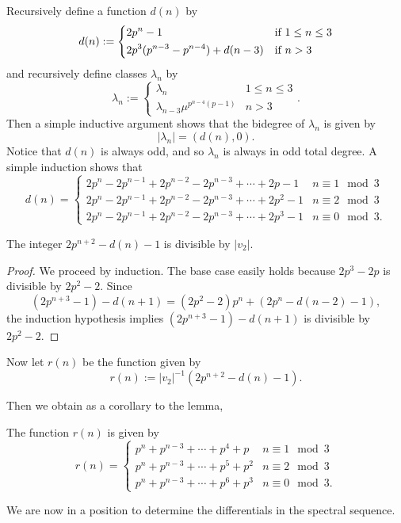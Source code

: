 Recursively define a function $d(n)$ by 
\[
d(n):= 
\begin{dcases*}
	2p^n-1 & if $1\leq n \leq 3$\\
	2p^3(p^{n-3}-p^{n-4}) + d(n-3) & if  $n>3$ 
\end{dcases*}
\]
and recursively define classes $\lambda_n$ by 
\[
\lambda_n:= \begin{cases}
	\lambda_n & 1\leq n \leq 3\\
	\lambda_{n-3}\mu^{p^{n-4}(p-1)} & n>3
\end{cases}.
\]
Then a simple inductive argument shows that the bidegree of $\lambda_n$ is given by
\begin{equation}
	|\lambda_n| = (d(n),0). 
\end{equation}
Notice that $d(n)$ is always odd, and so $\lambda_n$ is always in odd total degree. A simple induction shows that 
\[
d(n)=
\begin{cases}
	2p^n-2p^{n-1}+2p^{n-2}-2p^{n-3}+\cdots + 2p-1 & n\equiv 1 \mod 3\\
	2p^n-2p^{n-1}+2p^{n-2}-2p^{n-3}+\cdots + 2p^2-1 & n\equiv 2 \mod 3\\
	2p^n-2p^{n-1}+2p^{n-2}-2p^{n-3}+\cdots + 2p^3-1 & n\equiv 0 \mod 3.
\end{cases}
\]

\begin{lem}\label{lem:v2divisibility}
	The integer $2p^{n+2}-d(n)-1$ is divisible by $|v_2|$.
\end{lem}
\begin{proof}
	We proceed by induction. The base case easily holds because $2p^3-2p$ is divisible by $2p^2-2$. Since
	\[
	(2p^{n+3}-1)-d(n+1) = (2p^2-2)p^n + (2p^{n}-d(n-2)-1),
	\]
	the induction hypothesis implies $(2p^{n+3}-1)-d(n+1)$ is divisible by $2p^2-2$. 
\end{proof}


Now let $r(n)$ be the function given by 
\[
r(n):= |v_2|^{-1}(2p^{n+2}-d(n)-1).
\]

Then we obtain as a corollary to the lemma, 
\begin{cor}
The function $r(n)$ is given by 
\[
r(n) = \begin{cases}
	p^n+p^{n-3}+ \cdots +p^4+p & n\equiv 1 \mod 3\\
	p^n+p^{n-3}+ \cdots + p^5+p^2 & n\equiv 2 \mod 3\\
	p^n+p^{n-3}+ \cdots +p^6+ p^3 & n\equiv 0 \mod 3.
\end{cases}
\]	
\end{cor}
We are now in a position to determine the differentials in the spectral sequence. 


